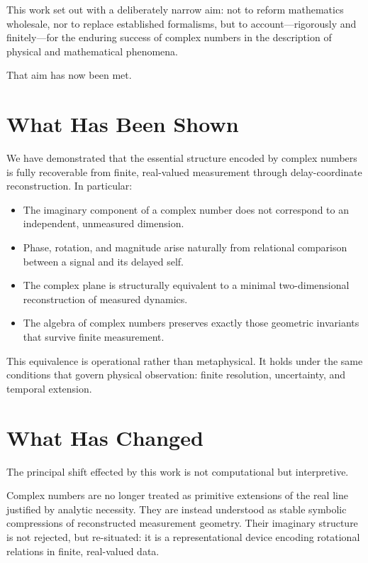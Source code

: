 \documentclass[12pt]{book}  %
\begin{document}
This work set out with a deliberately narrow aim: not to reform mathematics wholesale, nor to replace established formalisms, but to account—rigorously and finitely—for the enduring success of complex numbers in the description of physical and mathematical phenomena.

That aim has now been met.

\section*{What Has Been Shown}

We have demonstrated that the essential structure encoded by complex numbers is fully recoverable from finite, real-valued measurement through delay-coordinate reconstruction. In particular:

\begin{itemize}
    \item The imaginary component of a complex number does not correspond to an independent, unmeasured dimension.
    \item Phase, rotation, and magnitude arise naturally from relational comparison between a signal and its delayed self.
    \item The complex plane is structurally equivalent to a minimal two-dimensional reconstruction of measured dynamics.
    \item The algebra of complex numbers preserves exactly those geometric invariants that survive finite measurement.
\end{itemize}

This equivalence is operational rather than metaphysical. It holds under the same conditions that govern physical observation: finite resolution, uncertainty, and temporal extension.

\section*{What Has Changed}

The principal shift effected by this work is not computational but interpretive.

Complex numbers are no longer treated as primitive extensions of the real line justified by analytic necessity. They are instead understood as stable symbolic compressions of reconstructed measurement geometry. Their imaginary structure is not rejected, but re-situated: it is a representational device encoding rotational relations in finite, real-valued data.
\end{document}
